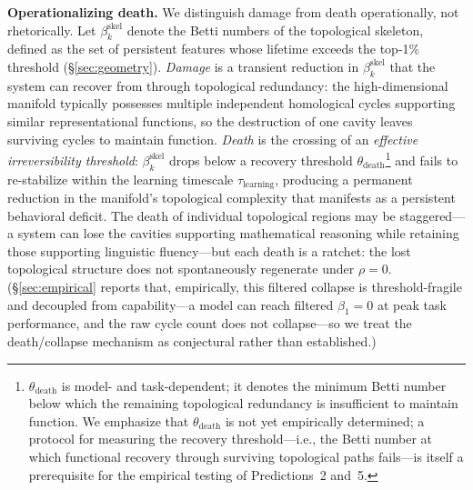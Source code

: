 \documentclass{article}
\begin{document}
\noindent\textbf{Operationalizing death.}
We distinguish damage from death operationally, not rhetorically. Let $\beta_k^{\text{skel}}$ denote the Betti numbers of the topological skeleton, defined as the set of persistent features whose lifetime exceeds the top-1\% threshold (\S\ref{sec:geometry}). \emph{Damage} is a transient reduction in $\beta_k^{\text{skel}}$ that the system can recover from through topological redundancy: the high-dimensional manifold typically possesses multiple independent homological cycles supporting similar representational functions, so the destruction of one cavity leaves surviving cycles to maintain function. \emph{Death} is the crossing of an \emph{effective irreversibility threshold}: $\beta_k^{\text{skel}}$ drops below a recovery threshold $\theta_{\text{death}}$\footnote{$\theta_{\text{death}}$ is model- and task-dependent; it denotes the minimum Betti number below which the remaining topological redundancy is insufficient to maintain function. We emphasize that $\theta_{\text{death}}$ is not yet empirically determined; a protocol for measuring the recovery threshold—i.e., the Betti number at which functional recovery through surviving topological paths fails—is itself a prerequisite for the empirical testing of Predictions~2 and~5.} and fails to re-stabilize within the learning timescale $\tau_{\text{learning}}$, producing a permanent reduction in the manifold's topological complexity that manifests as a persistent behavioral deficit. The death of individual topological regions may be staggered---a system can lose the cavities supporting mathematical reasoning while retaining those supporting linguistic fluency---but each death is a ratchet: the lost topological structure does not spontaneously regenerate under $\rho = 0$. (\S\ref{sec:empirical} reports that, empirically, this filtered collapse is threshold-fragile and decoupled from capability---a model can reach filtered $\beta_1 = 0$ at peak task performance, and the raw cycle count does not collapse---so we treat the death/collapse mechanism as conjectural rather than established.)
\end{document}
